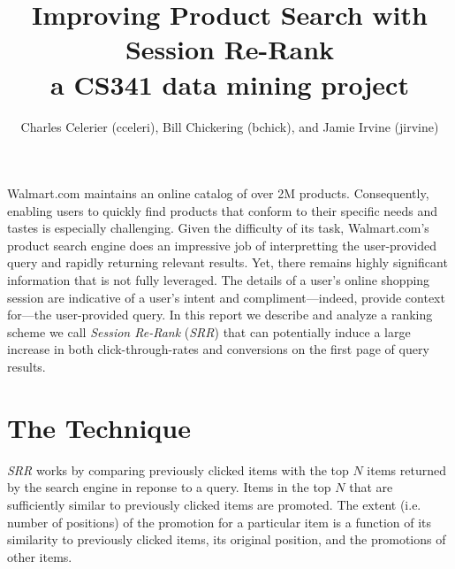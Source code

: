 \documentclass{article}
\title{Improving Product Search with Session Re-Rank\\
    \large{a CS341 data mining project}}
\author{Charles Celerier (cceleri), Bill Chickering (bchick),
        and Jamie Irvine (jirvine)}
\begin{document}
\maketitle

Walmart.com maintains an online catalog of over 2M products. Consequently,
enabling users to quickly find products that conform to their specific needs and
tastes is especially challenging. Given the difficulty of its task,
Walmart.com's product search engine does an impressive job of interpretting the
user-provided query and rapidly returning relevant results. Yet, there remains
highly significant information that is not fully leveraged. The details of a
user's online shopping session are indicative of a user's intent and
compliment---indeed, provide context for---the user-provided query. In this
report we describe and analyze a ranking scheme we call {\em Session Re-Rank}
({\em SRR}) that can potentially induce a large increase in both
click-through-rates and conversions on the first page of query results.

\section{The Technique}\label{sec:technique}

{\em SRR} works by comparing previously clicked items with the top $N$ items
returned by the search engine in reponse to a query. Items in the top $N$ that
are sufficiently similar to previously clicked items are promoted. The extent
(i.e. number of positions) of the promotion for a particular item is a function
of its similarity to previously clicked items, its original position, and the
promotions of other items.
\end{document}
